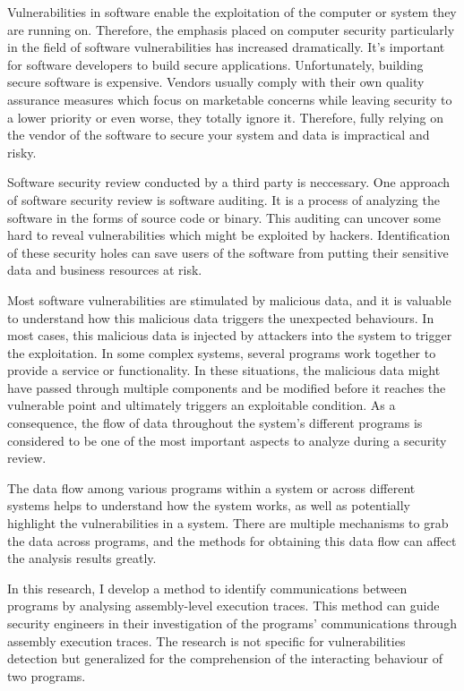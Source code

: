 \label{chapter:introduction}
Vulnerabilities in software enable the exploitation of the computer or system they are running on. Therefore, the emphasis placed on computer security particularly in the field of software vulnerabilities has increased dramatically. It's important for software developers to build secure applications. Unfortunately, building secure software is expensive. Vendors usually comply with their own quality assurance measures which focus on marketable concerns while leaving security to a lower priority or even worse, they totally ignore it. Therefore, fully relying on the vendor of the software to secure your system and data is impractical and risky. \cite{dowd_art_2006}

Software security review conducted by a third party is neccessary. One approach of software security review is software auditing. It is a process of analyzing the software in the forms of source code or binary. This auditing can uncover some hard to reveal vulnerabilities which might be exploited by hackers. Identification of these security holes can save users of the software from putting their sensitive data and business resources at risk. \cite{dowd_art_2006}

Most software vulnerabilities are stimulated by malicious data, and it is valuable to understand how this malicious data triggers the unexpected behaviours. In most cases, this malicious data is injected by attackers into the system to trigger the exploitation. In some complex systems, several programs work together to provide a service or functionality. In these situations, the malicious data might have passed through multiple components and be modified before it reaches the vulnerable point and ultimately triggers an exploitable condition. As a consequence, the flow of data throughout the system's different programs is considered to be one of the most important aspects to analyze during a security review. \cite{dowd_art_2006}

The data flow among various programs within a system or across different systems helps to understand how the system works, as well as potentially highlight the vulnerabilities in a system. There are multiple mechanisms to grab the data across programs, and the methods for obtaining this data flow can affect the analysis results greatly. 

In this research, I develop a method to identify communications between programs by analysing assembly-level execution traces. This method can guide security engineers in their investigation of the programs' communications through assembly execution traces. The research is not specific for vulnerabilities detection but generalized for the comprehension of the interacting behaviour of two programs.

